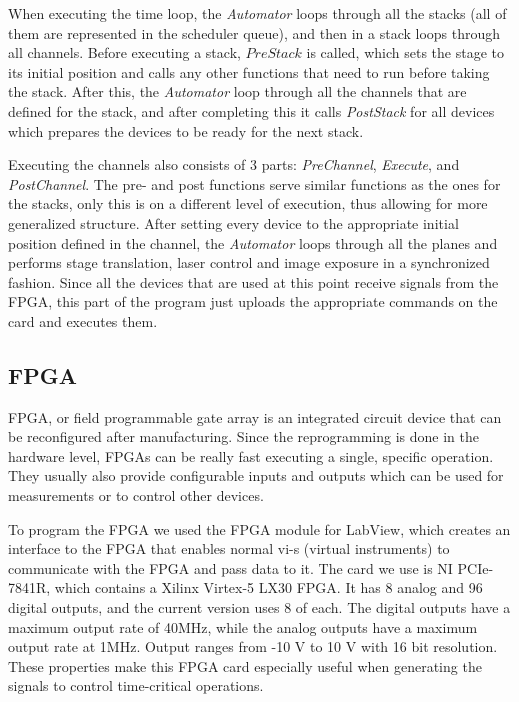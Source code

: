 \documentclass{tdk_style}
\begin{document}
When executing the time loop, the \emph{Automator} loops through all the stacks (all of them are represented in the scheduler queue), and then in a stack loops through all channels. Before executing a stack, $PreStack$ is called, which sets the stage to its initial position and calls any other functions that need to run before taking the stack. After this, the \emph{Automator} loop through all the channels that are defined for the stack, and after completing this it calls \emph{PostStack} for all devices which prepares the devices to be ready for the next stack.

Executing the channels also consists of 3 parts: \emph{PreChannel}, \emph{Execute}, and \emph{PostChannel}. The pre- and post functions serve similar functions as the ones for the stacks, only this is on a different level of execution, thus allowing for more generalized structure. After setting every device to the appropriate initial position defined in the channel, the \emph{Automator} loops through all the planes and performs stage translation, laser control and image exposure in a synchronized fashion. Since all the devices that are used at this point receive signals from the FPGA, this part of the program just uploads the appropriate commands on the card and executes them.


\subsection{FPGA}
\label{fpga}
FPGA, or field programmable gate array is an integrated circuit device that can be reconfigured after manufacturing. Since the reprogramming is done in the hardware level, FPGAs can be really fast executing a single, specific operation. They usually also provide configurable inputs and outputs which can be used for measurements or to control other devices.

To program the FPGA we used the FPGA module for LabView, which creates an interface to the FPGA that enables normal vi-s (virtual instruments) to communicate with the FPGA and pass data to it. The card we use is NI PCIe-7841R, which contains a Xilinx Virtex-5 LX30 FPGA. It has 8 analog and 96 digital outputs, and the current version uses 8 of each. The digital outputs have a maximum output rate of 40MHz, while the analog outputs have a maximum output rate at 1MHz. Output ranges from -10 V to 10 V with 16 bit resolution. These properties make this FPGA card especially useful when generating the signals to control time-critical operations.
\end{document}
